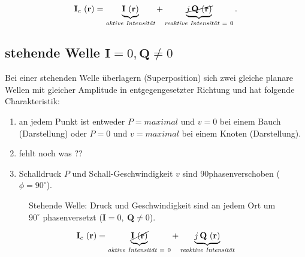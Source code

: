 \begin{equation}
	\mathbf{I}_c ~(\mathbf{r}) = \underbrace{\mathbf{I}~(\mathbf{r})}_{\textit{aktive Intensität}} + \underbrace{ \cancel{j\,\mathbf{Q}~(\mathbf{r})}}_{\textit{reaktive~Intensität}~=~0}.
	\label{helmholtz:equationIntensitaetComplexplanar}
\end{equation}	


\subsection{stehende Welle $\mathbf{I} = 0,\mathbf{Q} \neq 0$
\label{helmholtz:subsection:stehendeWelle}}

Bei einer stehenden Welle überlagern (Superposition) sich zwei gleiche planare Wellen mit gleicher Amplitude in entgegengesetzter Richtung und hat folgende Charakteristik:

\begin{enumerate}
\item an jedem Punkt ist entweder  $P = maximal$ und $v = 0$ bei einem Bauch (Darstellung) oder $P = 0$  und $ v = maximal$ bei einem Knoten (Darstellung).
\item fehlt noch was ??
\item Schalldruck $P$ und Schall-Geschwindigkeit $v$ sind 90\textdegree phasenverschoben ($\phi = 90^{\circ}$).
\end{enumerate}

\begin{figure}
\centering
{}
\caption{Stehende Welle: Druck und Geschwindigkeit sind an jedem Ort um $90^\circ$ phasenversetzt ($\mathbf I=0,\ \mathbf Q\neq0$).}
\end{figure}

\begin{equation}
	\mathbf{I}_c ~(\mathbf{r}) = \underbrace{\cancel{\mathbf{I}~(\mathbf{r})}}_{\textit{aktive Intensität}~=~0} + \underbrace{j\,\mathbf{Q}~(\mathbf{r})}_{\textit{reaktive~Intensität}}
	\label{helmholtz:equationIntensitaetComplexStehend}
\end{equation}	